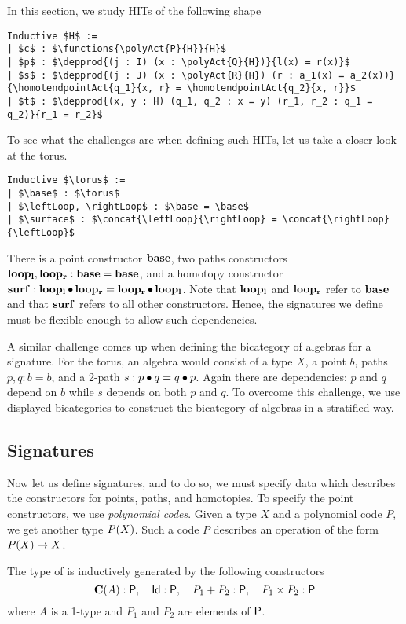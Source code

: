 In this section, we study HITs of the following shape
\begin{lstlisting}[mathescape=true]
Inductive $H$ :=
| $c$ : $\functions{\polyAct{P}{H}}{H}$
| $p$ : $\depprod{(j : I) (x : \polyAct{Q}{H})}{l(x) = r(x)}$
| $s$ : $\depprod{(j : J) (x : \polyAct{R}{H}) (r : a_1(x) = a_2(x))}{\homotendpointAct{q_1}{x, r} = \homotendpointAct{q_2}{x, r}}$
| $t$ : $\depprod{(x, y : H) (q_1, q_2 : x = y) (r_1, r_2 : q_1 = q_2)}{r_1 = r_2}$
\end{lstlisting}
To see what the challenges are when defining such HITs, let us take a closer look at the torus.

\begin{lstlisting}[mathescape=true]
Inductive $\torus$ :=
| $\base$ : $\torus$
| $\leftLoop, \rightLoop$ : $\base = \base$
| $\surface$ : $\concat{\leftLoop}{\rightLoop} = \concat{\rightLoop}{\leftLoop}$
\end{lstlisting}

There is a point constructor $\operatorname{\mathbf{base}}$, two paths constructors $\operatorname{\mathbf{loop_l}}, \operatorname{\mathbf{loop_r}} : \operatorname{\mathbf{base}} = \operatorname{\mathbf{base}}$,
and a homotopy constructor $\operatorname{\mathbf{surf}} : \operatorname{\mathbf{loop_l}} \bullet \operatorname{\mathbf{loop_r}} = \operatorname{\mathbf{loop_r}} \bullet \operatorname{\mathbf{loop_l}}$.
Note that $\operatorname{\mathbf{loop_l}}$ and $\operatorname{\mathbf{loop_r}}$ refer to $\operatorname{\mathbf{base}}$ and that $\operatorname{\mathbf{surf}}$ refers to all other constructors.
Hence, the signatures we define must be flexible enough to allow such dependencies.

A similar challenge comes up when defining the bicategory of algebras for a signature.
For the torus, an algebra would consist of a type $X$, a point $b$, paths $p, q : b = b$, and a 2-path $s : p \bullet q = q \bullet p$.
Again there are dependencies: $p$ and $q$ depend on $b$ while $s$ depends on both $p$ and $q$.
To overcome this challenge, we use displayed bicategories to construct the bicategory of algebras in a stratified way.

\subsection{Signatures}\label{sec:signatures}
Now let us define signatures, and to do so, we must specify data which describes the constructors for points, paths, and homotopies.
To specify the point constructors, we use \emph{polynomial codes}.
Given a type $X$ and a polynomial code $P$, we get another type $P(X)$.
Such a code $P$ describes an operation of the form $P(X) \rightarrow X$.

\begin{definition}
The type of  is inductively generated by the following constructors
\[ 
\operatorname{\mathbf{C}}(A) : \mathsf{P}, \quad \mathsf{Id} : \mathsf{P}, \quad P_1 + P_2 : \mathsf{P}, \quad P_1 \times P_2 : \mathsf{P}
\]
where $A$ is a 1-type and $P_1$ and $P_2$ are elements of $\mathsf{P}$.
\end{definition}

